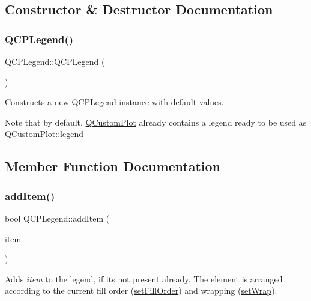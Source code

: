 \subsection{Constructor \& Destructor Documentation}
\mbox{\label{class_q_c_p_legend_a0001a456989bd07ea378883651fabd72}} 
\subsubsection{\texorpdfstring{Q\+C\+P\+Legend()}{QCPLegend()}}
{\footnotesize\ttfamily Q\+C\+P\+Legend\+::\+Q\+C\+P\+Legend (\begin{DoxyParamCaption}{ }\end{DoxyParamCaption})\hspace{0.3cm}{\ttfamily [explicit]}}

Constructs a new \hyperlink{class_q_c_p_legend}{Q\+C\+P\+Legend} instance with default values.

Note that by default, \hyperlink{class_q_custom_plot}{Q\+Custom\+Plot} already contains a legend ready to be used as \hyperlink{class_q_custom_plot_a4eadcd237dc6a09938b68b16877fa6af}{Q\+Custom\+Plot\+::legend} 

\subsection{Member Function Documentation}
\mbox{\label{class_q_c_p_legend_a3ab274de52d2951faea45a6d975e6b3f}} 
\subsubsection{\texorpdfstring{add\+Item()}{addItem()}}
{\footnotesize\ttfamily bool Q\+C\+P\+Legend\+::add\+Item (\begin{DoxyParamCaption}\item[{\hyperlink{class_q_c_p_abstract_legend_item}{Q\+C\+P\+Abstract\+Legend\+Item} $\ast$}]{item }\end{DoxyParamCaption})}

Adds {\itshape item} to the legend, if it\textquotesingle{}s not present already. The element is arranged according to the current fill order (\hyperlink{class_q_c_p_layout_grid_affc2f3cfd22f28698c5b29b960d2a391}{set\+Fill\+Order}) and wrapping (\hyperlink{class_q_c_p_layout_grid_ab36af18d77e4428386d02970382ee598}{set\+Wrap}).

